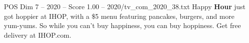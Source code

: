 \begin{textsample}{POS Dim 7 – 2020 – Score 1.00 – 2020/tv\_com\_2020\_38.txt}  \label{ex:f7_pos_084}
Happy \textbf{Hour} just got hoppier at IHOP, with a \$5 menu featuring pancakes, burgers, and more yum-yums.
So while you can't buy happiness, you can buy hoppiness.
Get free delivery at IHOP.com.

\end{textsample}
